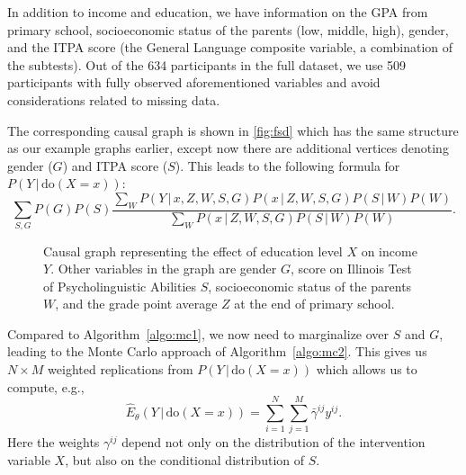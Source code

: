 \documentclass{statsoc}
\newcommand{\+}[1]{\ensuremath{\mathbf{#1}}}
\newcommand{\doo}{\textrm{do}}
\newcommand{\given}{{ \, | \, }}
\begin{document}
In addition to income and education, we have information on the GPA from primary school, socioeconomic status of the parents (low, middle, high), gender, and the ITPA score (the General Language composite variable, a combination of the subtests). Out of the 634 participants in the full dataset, we use 509 participants with fully observed aforementioned variables and avoid considerations related to missing data.

The corresponding causal graph is shown in \autoref{fig:fsd} which has the same structure as our example graphs earlier, except now there are additional vertices denoting gender ($G$) and ITPA score ($S$). This leads to the following formula for $P(Y \given \doo(X = x))$:
\begin{equation*}
\label{eq:fsd}
\sum_{S,G} P(G)P(S)\frac{\sum_{W} P(Y\given x, Z, W, S, G)P(x \given Z,W,S,G)P(S \given W)P(W)}{\sum_{W} P(x \given Z,W,S,G)P(S\given W)P(W)}.
\end{equation*}
\begin{figure}[!ht]
	\centering
	\caption{Causal graph representing the effect of education level $X$ on income $Y$. Other variables in the graph are gender $G$, score on Illinois Test of Psycholinguistic Abilities $S$, socioeconomic status of the parents $W$, and the grade point average $Z$ at the end of primary school.}
	\label{fig:fsd}
\end{figure}

Compared to Algorithm~\ref{algo:mc1}, we now need to marginalize over $S$ and $G$, leading to the Monte Carlo approach of Algorithm~\ref{algo:mc2}. This gives us $N \times M$ weighted replications from $P(Y \given  \doo(X = x))$ which allows us to compute, e.g.,
\[
\widehat E_\theta(Y \given \doo(X = x)) = \sum_{i=1}^{N}\sum_{j=1}^{M} \bar \gamma^{ij} y^{ij}.
\]
Here the weights $\gamma^{ij}$ depend not only on the distribution of the intervention variable $X$, but also on the conditional distribution of $S$.
\end{document}
